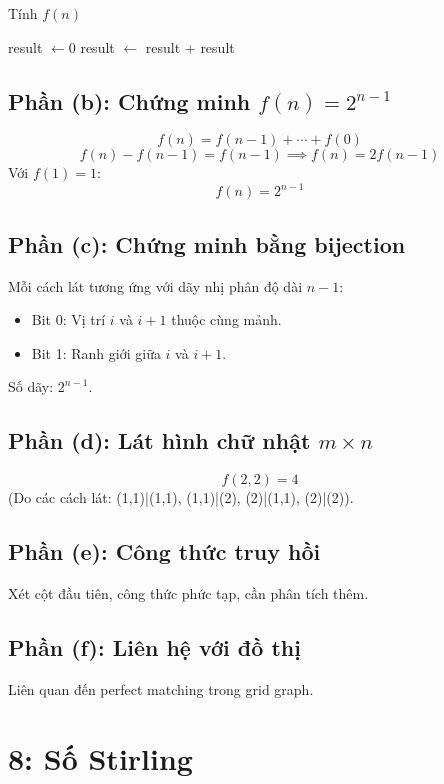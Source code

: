 \documentclass[a4paper,12pt]{article}
\theoremstyle{plain}
\theoremstyle{definition}
\begin{document}
\begin{algorithm}
\caption{Tính \( f(n) \)}
\begin{algorithmic}
     
    \EndIf
    \State result $\gets 0$
        \State result $\gets$ result + 
    \EndFor
    \State \Return result
\EndFunction
\end{algorithmic}
\end{algorithm}

\subsection*{Phần (b): Chứng minh \( f(n) = 2^{n-1} \)}
\[
f(n) = f(n-1) + \cdots + f(0)
\]
\[
f(n) - f(n-1) = f(n-1) \implies f(n) = 2f(n-1)
\]
Với \( f(1) = 1 \):
\[
f(n) = 2^{n-1}
\]

\subsection*{Phần (c): Chứng minh bằng bijection}
Mỗi cách lát tương ứng với dãy nhị phân độ dài \( n-1 \):
\begin{itemize}
    \item Bit 0: Vị trí \( i \) và \( i+1 \) thuộc cùng mảnh.
    \item Bit 1: Ranh giới giữa \( i \) và \( i+1 \).
\end{itemize}
Số dãy: \( 2^{n-1} \).

\subsection*{Phần (d): Lát hình chữ nhật \( m \times n \)}
\[
f(2,2) = 4
\]
(Do các cách lát: (1,1)|(1,1), (1,1)|(2), (2)|(1,1), (2)|(2)).

\subsection*{Phần (e): Công thức truy hồi}
Xét cột đầu tiên, công thức phức tạp, cần phân tích thêm.

\subsection*{Phần (f): Liên hệ với đồ thị}
Liên quan đến perfect matching trong grid graph.

\section*{8: Số Stirling}
\end{document}
